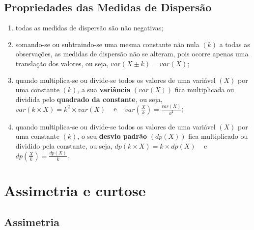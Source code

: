 \documentclass[11pt,fleqn]{book} %
\begin{document}
\section{Propriedades das Medidas de Dispersão}

\begin{enumerate}

\item todas as medidas de dispersão são não negativas; \\

\item somando-se ou subtraindo-se uma mesma constante não nula $(k)$ a todas as observações, as medidas de dispersão não se alteram, pois ocorre apenas uma translação dos valores, ou seja, $var(X \pm k)=var(X)$; \\

\item quando multiplica-se ou divide-se todos os valores de uma variável $(X)$ por uma constante $(k)$, a sua {\bf variância} $(var(X))$ fica multiplicada ou dividida pelo {\bf quadrado da constante}, ou seja, $var(k \times X)=k^2 \times var(X)$ \,\,\, e \,\,\, $\displaystyle var\left(\frac{X}{k}\right)=\frac{var(X)}{k^2}$; \\

\item quando multiplica-se ou divide-se todos os valores de uma variável $(X)$ por uma constante $(k)$, o seu {\bf desvio padrão} $(dp(X))$ fica multiplicado ou dividido pela constante, ou seja, $dp(k \times X)=k \times dp(X)$  \,\,\, e \,\,\, $\displaystyle dp\left(\frac{X}{k}\right)=\frac{dp(X)}{k}$. \\

\end{enumerate}






\chapter{Assimetria e curtose}\label{cap:assimetriaecurtose}


\section{Assimetria}
\end{document}
